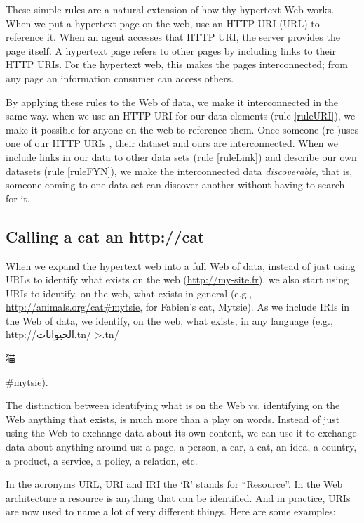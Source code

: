 These simple rules are a natural extension of how thy hypertext Web works. When we put a hypertext page 
on the web, use an HTTP URI (URL) to reference it.  When an agent accesses that HTTP URI, the server provides 
the page itself.  A hypertext page refers to other pages by including links to their HTTP URIs. 
For the hypertext web, this makes the pages interconnected; from any page an 
information consumer can access others.

By applying these  rules to the Web of data, we make it interconnected in the same way.  
when we use an HTTP URI   for our data elements (rule \ref{ruleURI}), 
we make it possible for anyone on the web to reference them. Once someone
(re-)uses one of our HTTP URIs , their dataset and ours
are interconnected.  When we include links in our data to 
other data sets (rule \ref{ruleLink}) and  describe our own 
datasets (rule \ref{ruleFYN}), we make 
the interconnected data \emph{discoverable}, that is, 
someone coming to one data set can discover another
without having to search for it. 


\hypertarget{calling-a-cat-an-httpcat}{%
\subsection{Calling a cat an
http://cat}\label{calling-a-cat-an-httpcat}}

When we expand the hypertext web into a full Web of data, instead of just using URLs to 
identify what exists on the web (\url{http://my-site.fr}), we also start using
URIs to identify, on the web, what exists in general
(e.g., \url{http://animals.org/cat\#mytsie}, for Fabien's cat, Mytsie).  As we include IRIs in the Web of data, we identify,
on the web, what exists, in any language
(e.g., http://\<الحيوانات.tn/ >.tn/\begin{CJK*}{UTF8}{gbsn}猫
\end{CJK*}\#mytsie).



The distinction between identifying what is on the Web vs. identifying
on the Web anything that exists, is much more than a play on words.
Instead of just using the Web to exchange data about its own content, we
can use it to exchange data about anything around us: a page, a person,
a car, a cat, an idea, a country, a product, a service, a policy, a
relation, etc.

In the acronyms URL, URI and IRI the `R' stands for ``Resource''. In the
Web architecture a resource is anything that can be identified. And in
practice, URIs are now used to name a lot of very different things. Here
are some examples:

